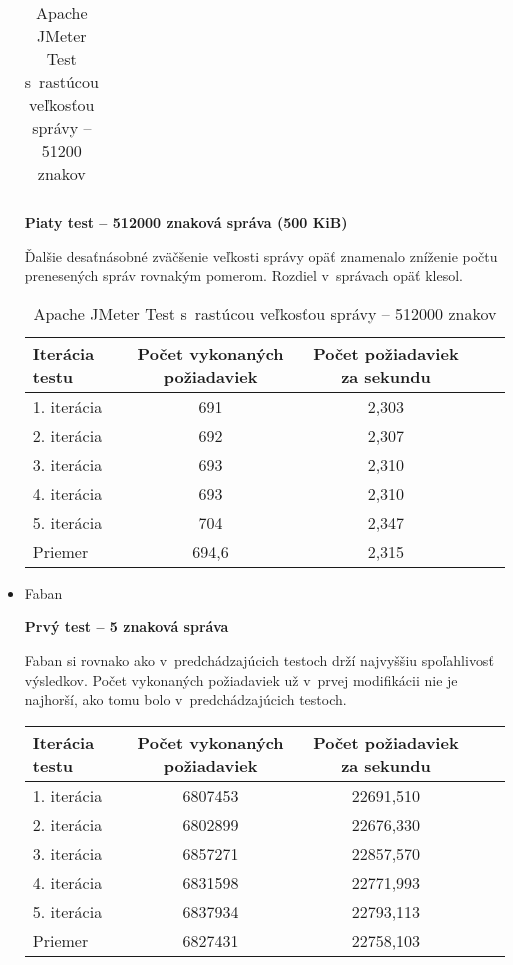 \documentclass[12pt,oneside,final]{fithesis-utf8}
\begin{document}
\begin{itemize}
\begin{table}[H]
\begin{center}
\begin{tabular}{ | l | c | c | c | c |}
\end{tabular}
\end{center}
\caption{Apache JMeter Test s~rastúcou veľkosťou správy -- 51200 znakov}
\end{table}


\textbf{Piaty test -- 512000 znaková správa (500 KiB)}

Ďalšie desaťnásobné zväčšenie veľkosti správy opäť znamenalo zníženie počtu prenesených správ rovnakým pomerom. Rozdiel v~správach opäť klesol.

\begin{table}[H]
\begin{center}
\begin{tabular}{ | l | c | c | c | c |}
		\hline
		 \textbf{Iterácia testu} & \textbf{Počet vykonaných požiadaviek} & \textbf{Počet požiadaviek za sekundu} \\ \hline
		 1. iterácia & 691 & 2,303 \\ \hline
		 2. iterácia & 692 & 2,307 \\ \hline
		 3. iterácia & 693 & 2,310 \\ \hline
		 4. iterácia & 693 & 2,310 \\ \hline
		 5. iterácia & 704 & 2,347 \\ \hline
		 Priemer & 694,6 & 2,315 \\ \hline
		 
\end{tabular}
\end{center}
\caption{Apache JMeter Test s~rastúcou veľkosťou správy -- 512000 znakov}
\end{table}

\item Faban

\textbf{Prvý test -- 5 znaková správa}

Faban si rovnako ako v~predchádzajúcich testoch drží najvyššiu spoľahlivosť výsledkov. Počet vykonaných požiadaviek už v~prvej modifikácii nie je najhorší, ako tomu bolo v~predchádzajúcich testoch.

\begin{table}[H]
\begin{center}
\begin{tabular}{ | l | c | c | c | c |}
		\hline
		 \textbf{Iterácia testu} & \textbf{Počet vykonaných požiadaviek} & \textbf{Počet požiadaviek za sekundu} \\ \hline
		 1. iterácia & 6807453 & 22691,510 \\ \hline
		 2. iterácia & 6802899 & 22676,330 \\ \hline
		 3. iterácia & 6857271 & 22857,570 \\ \hline
		 4. iterácia & 6831598 & 22771,993 \\ \hline
		 5. iterácia & 6837934 & 22793,113 \\ \hline
		 Priemer & 6827431 & 22758,103 \\ \hline
		 

\end{tabular}
\end{center}
\end{table}
\end{itemize}
\end{document}

